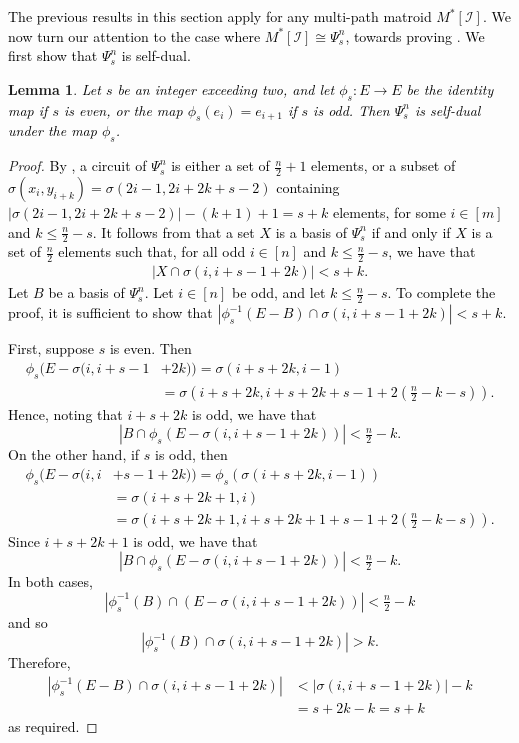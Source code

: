 \documentclass[11pt]{amsart}
\newtheorem{lemma}[theorem]{Lemma}
\newcommand{\blue}{\textcolor{black}}
\newcommand{\bloo}{\textcolor{black}}
\begin{document}
\blue{The previous results in this section apply for any multi-path matroid $M^*[\mathscr I]$. We now turn our attention to the case where $M^*[\mathscr I]\cong \Psi^n_s$, towards proving }. \bloo{We first show that $\Psi^n_s$ is self-dual.}

\begin{lemma} \label{selfdual}
	\bloo{Let $s$ be an integer exceeding two, and let $\phi_s:E \rightarrow E$ be the identity map if $s$ is even, or the map $\phi_s(e_i) = e_{i+1}$ if $s$ is odd. Then $\Psi^n_s$ is self-dual under the map $\phi_s$.}
\end{lemma}

\begin{proof}
\bloo{By , a circuit of $\Psi^n_s$ is either a set of $\frac{n}{2}+1$ elements, or a subset of $\sigma(x_i,y_{i+k})=\sigma(2i-1,2i+2k+s-2)$ containing $\left.|\sigma(2i-1,2i+2k+s-2)|-(k+1)+1 = s+k\right.$ elements, for some $i \in [m]$ and $k \leq \frac{n}{2}-s$. It follows from  that a set $X$ is a basis of $\Psi^n_s$ if and only if $X$ is a set of $\frac{n}{2}$ elements such that, for all odd $i \in [n]$ and $k \leq \frac{n}{2}-s$, we have that
\begin{align*}
\left|X \cap \sigma(i,i+s-1+2k)\right| < s+k.
\end{align*}
Let $B$ be a basis of $\Psi^n_s$. Let $i \in [n]$ be odd, and let $k \leq \frac{n}{2}-s$. To complete the proof, it is sufficient to show that $\left|\phi_s^{-1}(E-B) \cap \sigma(i,i+s-1+2k)\right| < s+k$.}
	
\bloo{First, suppose $s$ is even. Then 
\begin{align*}
\phi_s(E-\sigma(i,i+s-1&+2k)) = \sigma(i+s+2k,i-1) \\
&= \sigma\left(i+s+2k,i+s+2k+s-1+2\left(\tfrac{n}{2}-k-s\right)\right).
\end{align*}
Hence, noting that $i+s+2k$ is odd, we have that 
\[\left|B \cap \phi_s\left(E-\sigma(i,i+s-1+2k)\right)\right| < \tfrac{n}{2}-k.\]
On the other hand, if $s$ is odd, then
\begin{align*}
\phi_s(E-\sigma(i,i&+s-1+2k)) = \phi_s(\sigma(i+s+2k,i-1)) \\
&= \sigma(i+s+2k+1,i)\\ 
&= \sigma\left(i+s+2k+1, i+s+2k+1 + s-1 + 2\left(\tfrac{n}{2}-k-s\right)\right).
\end{align*}
Since $i+s+2k+1$ is odd, we have that 
\[
\left|B \cap \phi_s\left(E-\sigma(i,i+s-1+2k)\right)\right| < \tfrac{n}{2}-k.
\]}
\bloo{In both cases, 
\[
\left|\phi_s^{-1}(B) \cap \left(E-\sigma(i,i+s-1+2k)\right)\right| < \tfrac{n}{2}-k
\]
and so 
\[
\left|\phi_s^{-1}(B) \cap \sigma(i,i+s-1+2k)\right| > k.
\]
Therefore, 
\begin{align*}
\left|\phi_s^{-1}(E-B) \cap \sigma(i,i+s-1+2k)\right| &< |\sigma(i,i+s-1+2k)| - k \\
&= s+2k-k = s+k
\end{align*}
as required.}
\end{proof}
\end{document}
